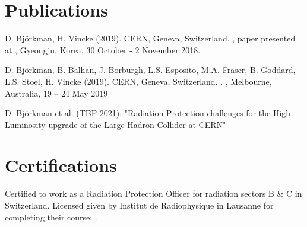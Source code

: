 \documentclass[a4paper,10pt]{article}
\newcommand{\MYhref}[3][blue]{\href{#2}{\color{#1}{#3}}}%
\begin{document}
 
 
 
 
 
 
\section{Publications}
{\small 
\begin{enumerate}[label={[\arabic*]}]
  \item D. Björkman, H. Vincke (2019). CERN, Geneva, Switzerland. \MYhref{https://www.oecd-nea.org/science/wprs/egsaatif/}{"High Energy Internal Beam Dump System for the Super Proton Synchrotron"}, paper presented at , Gyeongju, Korea, 30 October - 2 November 2018.
 
  \item D. Björkman, B. Balhan, J. Borburgh, L.S. Esposito, M.A. Fraser, B. Goddard, L.S. Stoel, H. Vincke (2019).   CERN, Geneva, Switzerland. \MYhref{http://accelconf.web.cern.ch/AccelConf/ipac2019/papers/wepmp024.pdf}{"Alternative Material Choices to Reduce Activation of Extraction Equipment"}. , Melbourne, Australia, 19 – 24 May 2019 
   \item \MYhref{https://inspirehep.net/literature/1626372}{"SPS Slow Extraction Losses and Activation: Challenges and Possibilities for Improvemen"}
   \item \MYhref{https://cds.cern.ch/record/2668989}{"Improvements to the SPS Slow Extraction for High Intensity Operation"}
  \item \MYhref{https://ipac2019.vrws.de/papers/wepmp031.pdf}{"SPS Slow Extraction Losses and Activation: Update on Recent Improvements"}
  \item \MYhref{https://edms.cern.ch/document/2369601/1}{D. Björkman et al. (TBP 2021). "Residual Dose Rate measurements and FLUKA predictions for the ATLAS experiment in Long Shut-Down 2 after 6 months of cool-down", EDMS 2369601}  

  \item D. Björkman et al. (TBP 2021). "Radiation Protection challenges for the High Luminosity upgrade of the Large Hadron Collider at CERN"  
  
  
\end{enumerate}


 
\section{Certifications}
Certified to work as a Radiation Protection Officer for radiation sectors B $\&$ C in Switzerland. Licensed given by Institut de Radiophysique in Lausanne for completing their course: \MYhref{ https://fmp16srvprd.unil.ch/fmi/webd/IRA_Cours_radioprotection}{\textsc{Radiation Protection Expert}}.
 
}
\end{document}
